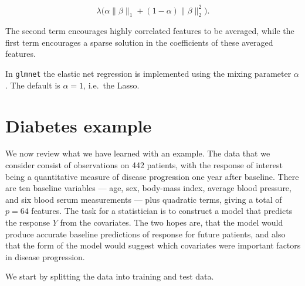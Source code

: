 \documentclass[
]{book}
\begin{document}
\[\lambda \Big(\alpha \|\beta\|_1+(1-\alpha)\|\beta\|_2^2\Big).\]

The second term encourages highly correlated features to be averaged, while
the first term encourages a sparse solution in the coefficients of these averaged features.

In \texttt{glmnet} the elastic net regression is implemented using the mixing parameter \(\alpha\). The default is \(\alpha=1\), i.e.~the Lasso.

\hypertarget{diabetes-example}{%
\section{Diabetes example}\label{diabetes-example}}

We now review what we have learned with an example. The data that we consider consist of
observations on 442 patients, with the response of interest being a quantitative
measure of disease progression one year after baseline. There are ten baseline
variables --- age, sex, body-mass index, average blood pressure, and six blood
serum measurements --- plus quadratic terms, giving a total of \(p=64\) features. The task for a statistician is to construct a model that predicts the response \(Y\) from the covariates. The two hopes are, that the model would produce accurate baseline
predictions of response for future patients, and also that the form of the model would suggest
which covariates were important factors in disease progression.

We start by splitting the data into training and test data.
\end{document}
